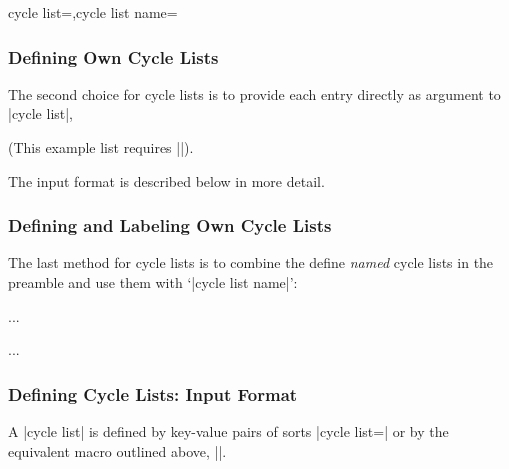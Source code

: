 \begin{pgfplotskeylist}{cycle list=,cycle list name=}
\subsubsection{Defining Own Cycle Lists}
The second choice for cycle lists is to provide each entry directly as argument to |cycle list|,
\begin{codeexample}[]
\end{codeexample}
	(This example list requires |\usetikzlibrary{plotmarks}|).

	The input format is described below in more detail.

\subsubsection{Defining and Labeling Own Cycle Lists}
The last method for cycle lists is to combine the define \emph{named} cycle lists in the preamble and use them with `|cycle list name|':
\begin{command}{\pgfplotscreateplotcyclelist{}}%
\end{command}
\begin{codeexample}
...
\begin{axis}[cycle list name=mylist]
	...
\end{axis}
\end{codeexample}

\subsubsection{Defining Cycle Lists: Input Format}
A |cycle list| is defined by key-value pairs of sorts |cycle list=| or by the equivalent macro outlined above, |\pgfplotscreateplotcyclelist|.


\end{pgfplotskeylist}
